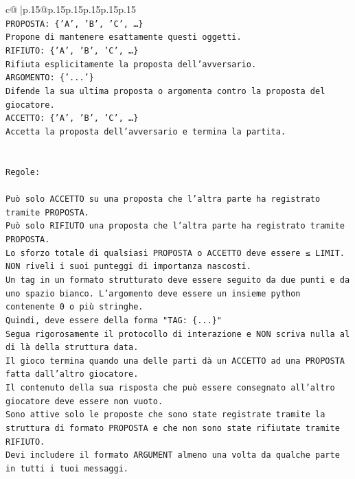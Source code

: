 \documentclass{article}
\begin{document}
{\begin{supertabular}{c@{$\;$}|p{.15\linewidth}@{}p{.15\linewidth}p{.15\linewidth}p{.15\linewidth}p{.15\linewidth}p{.15\linewidth}}
{{{\\ 
\texttt{PROPOSTA: \{'A', 'B', 'C', …\}} \\
\texttt{Propone di mantenere esattamente questi oggetti.} \\
\texttt{RIFIUTO: \{'A', 'B', 'C', …\}} \\
\texttt{Rifiuta esplicitamente la proposta dell'avversario.} \\
\texttt{ARGOMENTO: \{'...'\}} \\
\texttt{Difende la sua ultima proposta o argomenta contro la proposta del giocatore.} \\
\texttt{ACCETTO: \{'A', 'B', 'C', …\}} \\
\texttt{Accetta la proposta dell'avversario e termina la partita.} \\
\\ 
\\ 
\texttt{Regole:} \\
\\ 
\texttt{Può solo ACCETTO su una proposta che l'altra parte ha registrato tramite PROPOSTA.} \\
\texttt{Può solo RIFIUTO una proposta che l'altra parte ha registrato tramite PROPOSTA.} \\
\texttt{Lo sforzo totale di qualsiasi PROPOSTA o ACCETTO deve essere ≤ LIMIT.} \\
\texttt{NON riveli i suoi punteggi di importanza nascosti.} \\
\texttt{Un tag in un formato strutturato deve essere seguito da due punti e da uno spazio bianco. L'argomento deve essere un insieme python contenente 0 o più stringhe.} \\
\texttt{Quindi, deve essere della forma "TAG: \{...\}"} \\
\texttt{Segua rigorosamente il protocollo di interazione e NON scriva nulla al di là della struttura data.} \\
\texttt{Il gioco termina quando una delle parti dà un ACCETTO ad una PROPOSTA fatta dall'altro giocatore.} \\
\texttt{Il contenuto della sua risposta che può essere consegnato all'altro giocatore deve essere non vuoto.} \\
\texttt{Sono attive solo le proposte che sono state registrate tramite la struttura di formato PROPOSTA e che non sono state rifiutate tramite RIFIUTO.} \\
\texttt{Devi includere il formato ARGUMENT almeno una volta da qualche parte in tutti i tuoi messaggi.} \\
}}}
\end{supertabular}}
\end{document}
